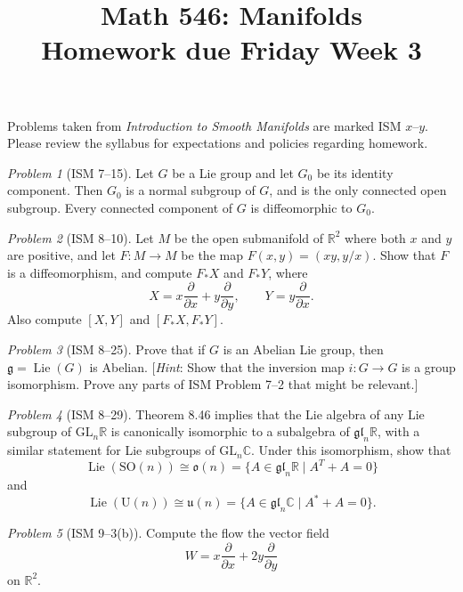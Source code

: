 \documentclass[11pt,twoside]{amsart}
\title{Math 546: Manifolds\\ Homework due Friday Week 3}
\theoremstyle{plain}
\theoremstyle{remark}
\newtheorem{prob}{Problem}
\theoremstyle{definition}
\theoremstyle{definition}
\newcommand{\RR}{\mathbb{R}}
\newcommand{\CC}{\mathbb{C}}
\newcommand{\SO}{\mathrm{SO}}
\newcommand{\U}{\mathrm{U}}
\newcommand{\GL}{\mathrm{GL}}
\newcommand{\gl}{\mathfrak{gl}}
\newcommand{\Lie}{\operatorname{Lie}}
\begin{document}
\maketitle

\noindent Problems taken from \emph{Introduction to Smooth Manifolds} are marked ISM $x$--$y$. Please review the syllabus for expectations and policies regarding homework.

\begin{prob}[ISM 7--15]
Let $G$ be a Lie group and let $G_0$ be its identity component. Then $G_0$ is a normal subgroup of $G$, and is the only connected open subgroup. Every connected component of $G$ is diffeomorphic to $G_0$.
\end{prob}

\begin{prob}[ISM 8--10]
Let $M$ be the open submanifold of $\RR^2$ where both $x$ and $y$ are positive, and let $F\colon M\to M$ be the map $F(x,y) = (xy,y/x)$. Show that $F$ is a diffeomorphism, and compute $F_*X$ and $F_*Y$, where
\[
  X = x\frac\partial{\partial x}+y\frac\partial{\partial y},\qquad Y = y\frac\partial{\partial x}.
\]
Also compute $[X,Y]$ and $[F_*X,F_*Y]$.
\end{prob}

\begin{prob}[ISM 8--25]
Prove that if $G$ is an Abelian Lie group, then $\mathfrak g = \Lie(G)$ is Abelian. [\emph{Hint}: Show that the inversion map $i\colon G\to G$ is a group isomorphism. Prove any parts of ISM Problem 7--2 that might be relevant.]
\end{prob}

\begin{prob}[ISM 8--29]
Theorem 8.46 implies that the Lie algebra of any Lie subgroup of $\GL_n\RR$ is canonically isomorphic to a subalgebra of $\gl_n\RR$, with a similar statement for Lie subgroups of $\GL_n\CC$. Under this isomorphism, show that
\[
  \Lie(\SO(n))\cong \mathfrak o(n) = \{A\in \gl_n\RR\mid A^T+A=0\}
\]
and
\[
  \Lie(\U(n))\cong \mathfrak u(n) = \{A\in \gl_n\CC\mid A^*+A=0\}.
\]
\end{prob}

\begin{prob}[ISM 9--3(b)]
Compute the flow the vector field
\[
  W = x\frac\partial{\partial x}+2y\frac\partial{\partial y}
\]
on $\RR^2$.
\end{prob}
\end{document}
